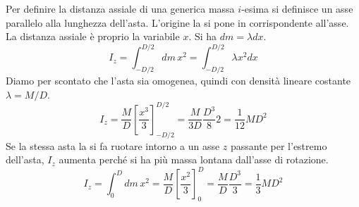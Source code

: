 \documentclass[10pt,a4paper]{book}
\begin{document}
\FloatBarrier
Per definire la distanza assiale di una generica massa $i$-esima si definisce un asse parallelo alla lunghezza dell'asta. L'origine la si pone in corrispondente all'asse. La distanza assiale è proprio la variabile $x$. Si ha $dm=\lambda dx$.
\[
	I_z = \int_{-D/2}^{D/2} dm\,x^2 = \int_{-D/2}^{D/2} \lambda x^2 dx
\]
Diamo per scontato che l'asta sia omogenea, quindi con densità lineare costante $\lambda=M/D$.
\[
	I_z = \frac{M}{D} \left[ \frac{x^3 }{3} \right]_{-D/2}^{D/2} = \frac{M}{3D}\frac{D^3 }{8}2 = \frac{1}{12}MD^2
\]
Se la stessa asta la si fa ruotare intorno a un asse $z$ passante per l'estremo dell'asta, $I_z$ aumenta perché si ha più massa lontana dall'asse di rotazione.
\[
	I_z = \int_0^D dm\,x^2 = \frac{M}{D}\left[ \frac{x^2 }{3} \right]_0^D = \frac{M}{D}\frac{D^3 }{3}= \frac{1}{3} MD^2
\]
\end{document}
